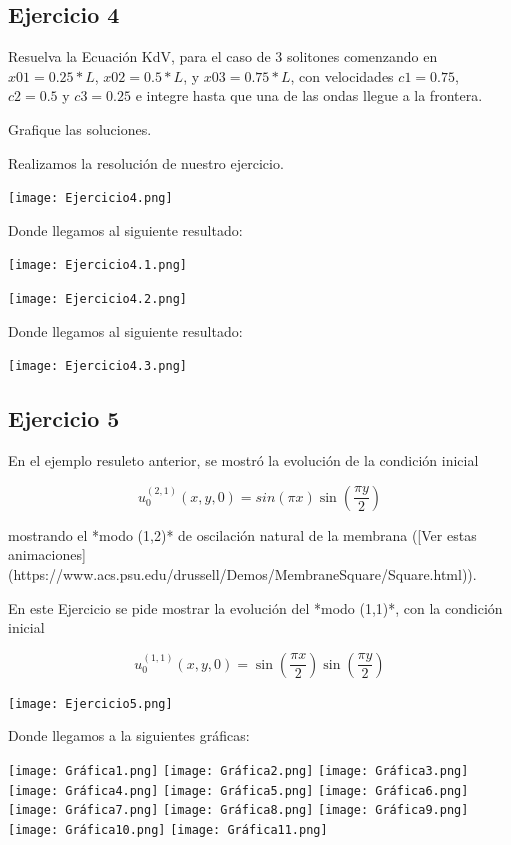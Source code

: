 \documentclass[12pt]{article}
\begin{document}


\subsection{Ejercicio 4}

Resuelva la Ecuación KdV, para el caso de 3 solitones comenzando en $x01 = 0.25*L$, $x02=0.5*L$, y $x03 = 0.75*L$, con velocidades $c1=0.75$, $c2=0.5$ y $c3=0.25$ e integre hasta que una de las ondas llegue a la frontera.

Grafique las soluciones.

Realizamos la resolución de nuestro ejercicio.

\begin{center}
    \texttt{[image: Ejercicio4.png]}
    
    Donde llegamos al siguiente resultado:
    
    \texttt{[image: Ejercicio4.1.png]}
    
     \texttt{[image: Ejercicio4.2.png]}
    
    Donde llegamos al siguiente resultado:
    
    \texttt{[image: Ejercicio4.3.png]}
\end{center}




\subsection{Ejercicio 5}

En el ejemplo resuleto anterior, se mostró la evolución de la condición inicial 

\begin{equation*}
u_0^{(2,1)}(x,y,0) = sin (\pi x) \sin (\frac{\pi y}{2})
\end{equation*}

mostrando el *modo (1,2)* de oscilación natural de la membrana ([Ver estas animaciones](https://www.acs.psu.edu/drussell/Demos/MembraneSquare/Square.html)). 
 
En este Ejercicio se pide mostrar la evolución del *modo (1,1)*, con la condición inicial 

\begin{equation*}
u_0^{(1,1)}(x,y,0) = \sin (\frac{\pi x}{2}) \sin (\frac{\pi y}{2})
\end{equation*}

\begin{center}
    \texttt{[image: Ejercicio5.png]}
    
    Donde llegamos a la siguientes gráficas:
    
    \texttt{[image: Gráfica1.png]}
    \texttt{[image: Gráfica2.png]}
    \texttt{[image: Gráfica3.png]}
    \texttt{[image: Gráfica4.png]}
    \texttt{[image: Gráfica5.png]}
    \texttt{[image: Gráfica6.png]}
    \texttt{[image: Gráfica7.png]}
    \texttt{[image: Gráfica8.png]}
    \texttt{[image: Gráfica9.png]}
    \texttt{[image: Gráfica10.png]}
    \texttt{[image: Gráfica11.png]}
    
\end{center}
\end{document}
